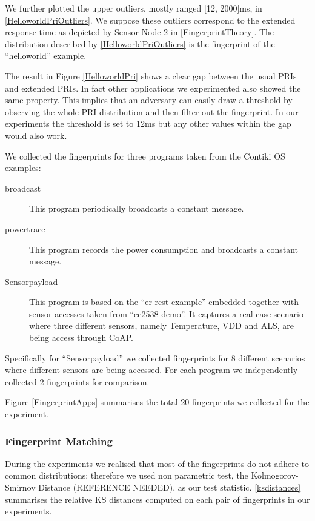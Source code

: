 \documentclass{article}
\begin{document}
We further plotted the upper outliers, mostly ranged [12, 2000]ms, in \ref{HelloworldPriOutliers}. We suppose these outliers correspond to the extended response time as depicted by Sensor Node 2 in \ref{FingerprintTheory}. The distribution described by \ref{HelloworldPriOutliers} is the fingerprint of the ``helloworld'' example.

The result in Figure \ref{HelloworldPri} shows a clear gap between the usual PRIs and extended PRIs. In fact other applications we experimented also showed the same property. This implies that an adversary can easily draw a threshold by observing the whole PRI distribution and then filter out the fingerprint. In our experiments the threshold is set to 12ms but any other values within the gap would also work. 

We collected the fingerprints for three programs taken from the Contiki OS examples:
\begin{description}
	\item[broadcast] This program periodically broadcasts a constant message.
	 
	\item[powertrace] This program records the power consumption and broadcasts a constant message.
	
	\item[Sensorpayload] This program is based on the ``er-rest-example'' embedded together with sensor accesses taken from ``cc2538-demo''. It captures a real case scenario where three different sensors, namely Temperature, VDD and ALS, are being access through CoAP.
\end{description}

Specifically for ``Sensorpayload'' we collected fingerprints for 8 different scenarios where different sensors are being accessed. For each program we independently collected 2 fingerprints for comparison.

Figure \ref{FingerprintApps} summarises the total 20 fingerprints we collected for the experiment.

\subsubsection{Fingerprint Matching}

During the experiments we realised that most of the fingerprints do not adhere to common distributions; therefore we used non parametric test, the Kolmogorov-Smirnov Distance (REFERENCE NEEDED), as our test statistic. \ref{ksdistances} summarises the relative KS distances computed on each pair of fingerprints in our experiments.
\end{document}
